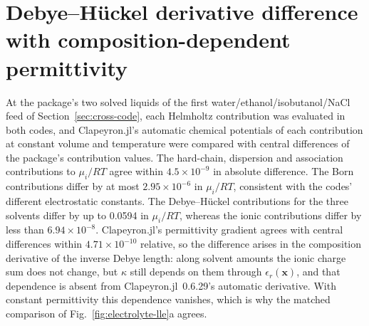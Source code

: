 \section{Debye--H\"uckel derivative difference with composition-dependent permittivity}
\label{sec:si-probe}
At the package's two solved liquids of the first water/ethanol/isobutanol/NaCl feed of Section~\ref{sec:cross-code}, each Helmholtz contribution was evaluated in both codes, and Clapeyron.jl's automatic chemical potentials of each contribution at constant volume and temperature were compared with central differences of the package's contribution values.
The hard-chain, dispersion and association contributions to $\mu_i/RT$ agree within $4.5\times10^{-9}$ in absolute difference.
The Born contributions differ by at most $2.95\times10^{-6}$ in $\mu_i/RT$, consistent with the codes' different electrostatic constants.
The Debye--H\"uckel contributions for the three solvents differ by up to 0.0594 in $\mu_i/RT$, whereas the ionic contributions differ by less than $6.94\times10^{-8}$.
Clapeyron.jl's permittivity gradient agrees with central differences within $4.71\times10^{-10}$ relative, so the difference arises in the composition derivative of the inverse Debye length: along solvent amounts the ionic charge sum does not change, but $\kappa$ still depends on them through $\epsilon_r(\mathbf{x})$, and that dependence is absent from Clapeyron.jl~0.6.29's automatic derivative.
With constant permittivity this dependence vanishes, which is why the matched comparison of Fig.~\ref{fig:electrolyte-lle}a agrees.


